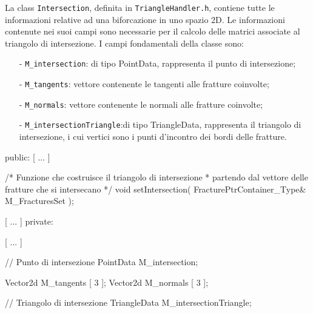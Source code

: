 La class \texttt{Intersection}, definita in \texttt{TriangleHandler.h}, contiene tutte le informazioni relative ad una biforcazione in uno spazio 2D.
Le informazioni contenute nei suoi campi sono necessarie per il calcolo delle matrici associate al triangolo di intersezione.
I campi fondamentali della classe sono:
	\begin{enumerate}
	\item[-] \texttt{M\_intersection}: di tipo PointData, rappresenta il punto di intersezione;
	\item[-] \texttt{M\_tangents}: vettore contenente le tangenti alle fratture coinvolte;
	\item[-] \texttt{M\_normals}: vettore contenente le normali alle fratture coinvolte;
	\item[-] \texttt{M\_intersectionTriangle}:di tipo TriangleData, rappresenta il triangolo di intersezione, i cui vertici sono i punti d'incontro dei bordi delle fratture.
	\end{enumerate} 

\begin{Code03_03}[caption={Classe \texttt{Intersection}}]
public:
	[ ... ]
	
	/* Funzione che costruisce il triangolo di intersezione 
	 * partendo dal vettore delle fratture che si intersecano 
	 */
	void setIntersection( FracturePtrContainer_Type& M_FracturesSet );
	
	[ ... ]
private:
	
	[ ... ]	
	
	// Punto di intersezione
	PointData M_intersection;
	
	Vector2d M_tangents [ 3 ];
	Vector2d M_normals [ 3 ];
	
	// Triangolo di intersezione
	TriangleData M_intersectionTriangle;
	
\end{Code03_03}

